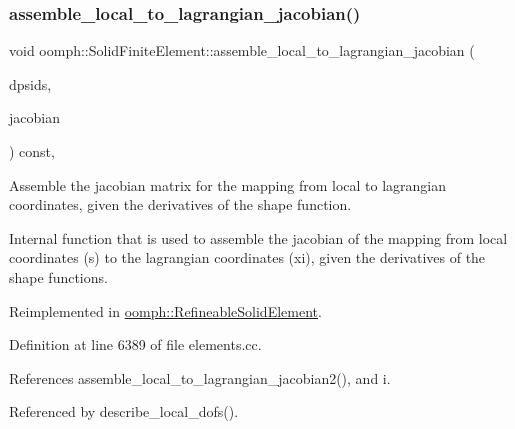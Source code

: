 \subsubsection{\texorpdfstring{assemble\+\_\+local\+\_\+to\+\_\+lagrangian\+\_\+jacobian()}{assemble\_local\_to\_lagrangian\_jacobian()}}
{\footnotesize\ttfamily void oomph\+::\+Solid\+Finite\+Element\+::assemble\+\_\+local\+\_\+to\+\_\+lagrangian\+\_\+jacobian (\begin{DoxyParamCaption}\item[{const \hyperlink{classoomph_1_1DShape}{D\+Shape} \&}]{dpsids,  }\item[{\hyperlink{classoomph_1_1DenseMatrix}{Dense\+Matrix}$<$ double $>$ \&}]{jacobian }\end{DoxyParamCaption}) const\hspace{0.3cm}{\ttfamily [private]}, {\ttfamily [virtual]}}



Assemble the jacobian matrix for the mapping from local to lagrangian coordinates, given the derivatives of the shape function. 

Internal function that is used to assemble the jacobian of the mapping from local coordinates (s) to the lagrangian coordinates (xi), given the derivatives of the shape functions. 

Reimplemented in \hyperlink{classoomph_1_1RefineableSolidElement_ae0d5a2fc617a11036a80d0d016292d7a}{oomph\+::\+Refineable\+Solid\+Element}.



Definition at line 6389 of file elements.\+cc.



References assemble\+\_\+local\+\_\+to\+\_\+lagrangian\+\_\+jacobian2(), and i.



Referenced by describe\+\_\+local\+\_\+dofs().

\mbox{\label{classoomph_1_1SolidFiniteElement_a33ab1427cebdc36ff77d897f5db9f3a6}} 
